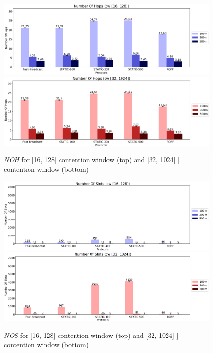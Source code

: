 		\begin{figure}[H]
			\centering
			\includegraphics[width=1.0\textwidth]{immagini/la-25/cw/16/noh}
			\includegraphics[width=1.0\textwidth]{immagini/la-25/cw/32/noh}
			\caption{\textit{NOH} for [16, 128] contention window (top) and [32, 1024] ] contention window (bottom)}
			\label{fig:la-cw-noh}
		\end{figure}
	
		\begin{figure}[H]
			\centering
			\includegraphics[width=1.0\textwidth]{immagini/la-25/cw/16/nos}
			\includegraphics[width=1.0\textwidth]{immagini/la-25/cw/32/nos}
			\caption{\textit{NOS} for [16, 128] contention window (top) and [32, 1024] ] contention window (bottom)}
			\label{fig:la-cw-nos}
		\end{figure}
	
